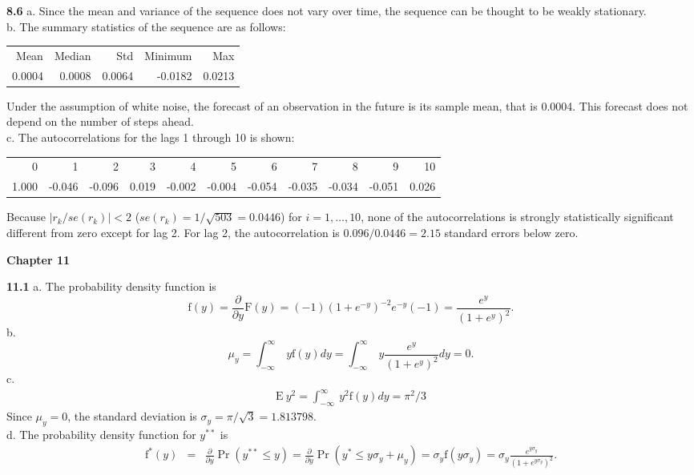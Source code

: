 \textbf{8.6} a. Since the mean and variance of the sequence does not
vary over time, the sequence can be thought to be weakly stationary.
\\
b. The summary statistics of the sequence are as follows:
\begin{center}\begin{tabular}{rrrrr} \hline
Mean& Median& Std& Minimum& Max\\
0.0004& 0.0008& 0.0064& -0.0182 & 0.0213\\
\hline
\end{tabular}\end{center}
Under the assumption of white noise, the forecast of an observation
in the future is its sample mean, that is 0.0004. This forecast does
not depend on the number of steps ahead.\\
c. The autocorrelations for the lags 1 through 10 is shown:
\begin{center}\begin{tabular}{rrrrrrrrrrr}
\hline
         0   &   1  &    2  &    3   &   4   &   5   &   6   &   7   &   8   &   9   &  10\\
     1.000 & -0.046 & -0.096 & 0.019 & -0.002 &  -0.004 & -0.054 & -0.035 & -0.034 & -0.051 & 0.026\\
\hline
\end{tabular}\end{center}
Because $|r_k/se(r_k)|<2$ ($se(r_k)=1/\sqrt{503} = 0.0446$) for
$i=1,\ldots,10$, none of the autocorrelations is strongly
statistically significant different from zero except for lag 2. For
lag 2, the autocorrelation is $0.096/0.0446 = 2.15$ standard errors
below zero.


\begin{center}\large \textbf{Chapter 11}\end{center}

\textbf{11.1} a. The probability density function is
\begin{equation*}
\mathrm{f}(y)=\frac{\partial}{\partial y}\mathrm{F}(y)
=(-1)(1+e^{-y})^{-2}e^{-y}(-1)= \frac{e^y}{(1+e^y)^2}.
\end{equation*}
b.
\begin{equation*}
\mu_y = \int_{-\infty}^{\infty}\ y \mathrm{f}(y)dy =
\int_{-\infty}^{\infty}\ y \frac{e^{y}}{(1+e^{y})^{2}}dy= 0.
\end{equation*}
c.
\begin{eqnarray*}
\mathrm{E~}y^2 = \int_{-\infty}^{\infty}\ y^2 \mathrm{f}(y)dy =
\pi^2 /3
\end{eqnarray*}
Since $\mu_y = 0$, the standard deviation is $ \sigma_y = \pi /
\sqrt{3}=1.813798.$ \\
d. The probability density function for $y^{\ast \ast}$ is\\
\begin{eqnarray*}
\mathrm{f}^{\ast}(y)&=& \frac{\partial}{\partial y}\Pr(y^{\ast \ast}
\leq y) = \frac{\partial}{\partial y}\Pr(y^{\ast } \leq y \sigma_y +
\mu_y) =\sigma_y \mathrm{f}(y \sigma_y) = \sigma_y
\frac{e^{y\sigma_y}}{(1+e^{y\sigma_y})^2}.
\end{eqnarray*}


